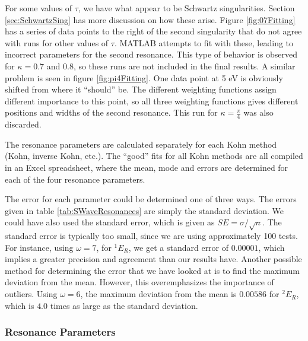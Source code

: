 \documentclass[Dissertation.tex]{subfiles}
\begin{document}
For some values of $\tau$, we have what appear to be Schwartz singularities.  Section \ref{sec:SchwartzSing} has more discussion on how these arise.  Figure \ref{fig:07Fitting} has a series of data points to the right of the second singularity that do not agree with runs for other values of $\tau$.  MATLAB attempts to fit with these, leading to incorrect parameters for the second resonance.  This type of behavior is observed for $\kappa = 0.7$ and $0.8$, so these runs are not included in the final results.  A similar problem is seen in figure \ref{fig:pi4Fitting}.  One data point at 5 eV is obviously shifted from where it ``should'' be.  The different weighting functions assign different importance to this point, so all three weighting functions gives different positions and widths of the second resonance.  This run for $\kappa = \frac{\pi}{4}$ was also discarded. 

The resonance parameters are calculated separately for each Kohn method (Kohn, inverse Kohn, etc.).  The ``good'' fits for all Kohn methods are all compiled in an Excel spreadsheet, where the mean, mode and errors are determined for each of the four resonance parameters.

The error for each parameter could be determined one of three ways.  The errors given in table \ref{tab:SWaveResonances} are simply the standard deviation.  We could have also used the standard error, which is given as $SE = \sigma / \sqrt{n}$.  The standard error is typically too small, since we are using approximately 100 tests.  For instance, using $\omega = 7$, for $^1E_R$, we get a standard error of $0.00001$, which implies a greater precision and agreement than our results have.  Another possible method for determining the error that we have looked at is to find the maximum deviation from the mean.  However, this overemphasizes the importance of outliers.  Using $\omega = 6$, the maximum deviation from the mean is $0.00586$ for $^2E_R$, which is $4.0$ times as large as the standard deviation. 



\subsubsection{Resonance Parameters}
\end{document}
